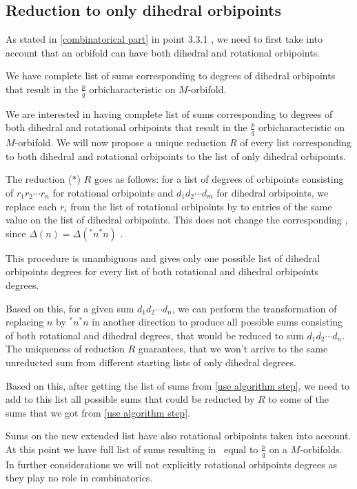 \subsection{Reduction to only dihedral orbipoints}\label{reduction only to dihedral}
As stated in \ref{combinatorical part} in point 3.3.1
, we need to first 
take into account that an orbifold can have both dihedral and rotational orbipoints. 

We have complete list of sums corresponding to degrees of dihedral orbipoints that result in 
the $\frac{p}{q}$ orbicharacteristic on $M$-orbifold. 

We are interested in having complete list of sums corresponding to degrees of both dihedral 
and rotational 
orbipoints that result in 
the $\frac{p}{q}$ orbicharacteristic on $M$-orbifold. 
We will now propose a unique  
reduction $R$ 
of every list corresponding to both dihedral and 
rotational orbipoints to the list of only dihedral orbipoints. 

The reduction 
($\ast$) 
$R$ goes as follows: for a list of degrees of orbipoints consisting of 
$r_1r_2\cdots r_n$ for rotational orbipoints and $d_1d_2\cdots d_m$ for dihedral orbipoints, 
we replace each $r_i$ from the list of rotational orbipoints by to entries of the same 
value on the list of dihedral orbipoints. This does not change the 
corresponding \Eoc, since $\Delta(n) = \Delta(^*n^*n)$ 
. 

This procedure is unambiguous and gives only one possible list of dihedral orbipoints degrees 
for every list of both rotational and dihedral orbipoints degrees. 

Based on this, for a given sum $d_1d_2\cdots d_n$,
we can perform the transformation of replacing $n$ by $^*n^*n$ in another direction to 
produce all possible sums consisting of both rotational and dihedral degrees, that 
would be reduced to sum $d_1d_2\cdots d_n$. The uniqueness of reduction $R$ 
guarantees, that 
we won't arrive to the same unreducted sum from different starting lists of only dihedral degrees.

Based on this, after getting the list of sums from \ref{use algorithm step}, we need to 
add to this list all possible sums that could be reducted by 
$R$ to some 
of the sums that we got from \ref{use algorithm step}. 

Sums on the new extended list have also rotational orbipoints taken into account. 
At this point we have full list of sums resulting in \Eoc\ equal to $\frac{p}{q}$ on a 
$M$-orbifolds. 
In further considerations we will not explicitly rotational orbipoints degrees as they play 
no role in combinatorics.

